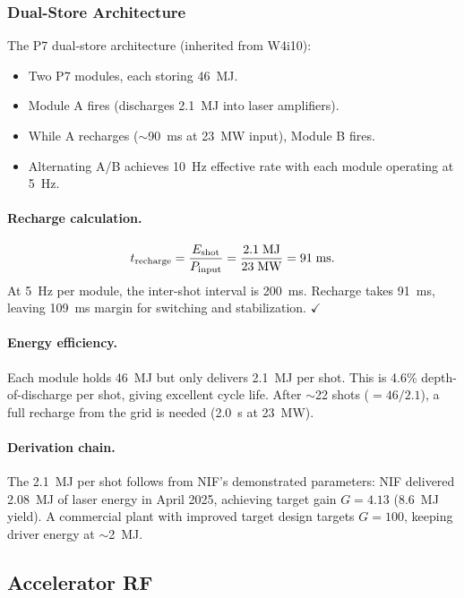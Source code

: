 \documentclass[11pt]{article}
\begin{document}
\subsubsection{Dual-Store Architecture}

The P7 dual-store architecture (inherited from W4i10):
\begin{itemize}
\item Two P7 modules, each storing 46~MJ.
\item Module A fires (discharges 2.1~MJ into laser amplifiers).
\item While A recharges ($\sim$90~ms at 23~MW input), Module B fires.
\item Alternating A/B achieves 10~Hz effective rate with each module
  operating at 5~Hz.
\end{itemize}

\paragraph{Recharge calculation.}
\begin{equation}
t_{\rm recharge} = \frac{E_{\rm shot}}{P_{\rm input}}
= \frac{2.1\;\mathrm{MJ}}{23\;\mathrm{MW}} = 91\;\mathrm{ms}.
\end{equation}
At 5~Hz per module, the inter-shot interval is 200~ms. Recharge takes
91~ms, leaving 109~ms margin for switching and stabilization. $\checkmark$

\paragraph{Energy efficiency.}
Each module holds 46~MJ but only delivers 2.1~MJ per shot.
This is 4.6\% depth-of-discharge per shot, giving excellent cycle life.
After $\sim$22 shots ($= 46/2.1$), a full recharge from the grid is
needed (2.0~s at 23~MW).

\paragraph{Derivation chain.}
The 2.1~MJ per shot follows from NIF's demonstrated parameters:
NIF delivered 2.08~MJ of laser energy in April 2025, achieving
target gain $G = 4.13$ (8.6~MJ yield). A commercial plant with
improved target design targets $G = 100$, keeping driver energy
at $\sim$2~MJ.

\subsection{Accelerator RF}\label{sec:accel}
\end{document}
